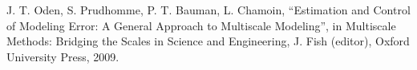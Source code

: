 J. T. Oden, S. Prudhomme, P. T. Bauman, L. Chamoin,
``Estimation and Control of Modeling Error: A General Approach to Multiscale Modeling'',
in Multiscale Methods: Bridging the Scales in Science and Engineering, J. Fish (editor),
Oxford University Press, 2009.
